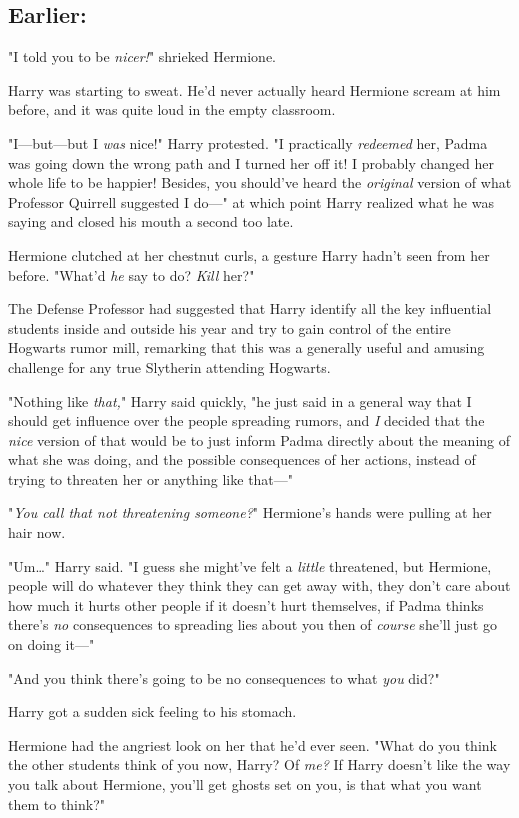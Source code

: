 \subsection{Earlier:}

"I told you to be \emph{nicer!}" shrieked Hermione.

Harry was starting to sweat. He'd never actually heard Hermione scream at him
before, and it was quite loud in the empty classroom.

"I---but---but I \emph{was} nice!" Harry protested. "I practically
\emph{redeemed} her, Padma was going down the wrong path and I turned her off
it! I probably changed her whole life to be happier! Besides, you should've
heard the \emph{original} version of what Professor Quirrell suggested I do---"
at which point Harry realized what he was saying and closed his mouth a second
too late.

Hermione clutched at her chestnut curls, a gesture Harry hadn't seen from her
before. "What'd \emph{he} say to do? \emph{Kill} her?"

The Defense Professor had suggested that Harry identify all the key influential
students inside and outside his year and try to gain control of the entire
Hogwarts rumor mill, remarking that this was a generally useful and amusing
challenge for any true Slytherin attending Hogwarts.

"Nothing like \emph{that,}" Harry said quickly, "he just said in a general way
that I should get influence over the people spreading rumors, and \emph{I}
decided that the \emph{nice} version of that would be to just inform Padma
directly about the meaning of what she was doing, and the possible consequences
of her actions, instead of trying to threaten her or anything like that---"

"\emph{You call that not threatening someone?}" Hermione's hands were pulling
at her hair now.

"Um{\ldots}" Harry said. "I guess she might've felt a \emph{little} threatened,
but Hermione, people will do whatever they think they can get away with, they
don't care about how much it hurts other people if it doesn't hurt themselves,
if Padma thinks there's \emph{no} consequences to spreading lies about you then
of \emph{course} she'll just go on doing it---"

"And you think there's going to be no consequences to what \emph{you} did?"

Harry got a sudden sick feeling to his stomach.

Hermione had the angriest look on her that he'd ever seen. "What do you think
the other students think of you now, Harry? Of \emph{me?} If Harry doesn't like
the way you talk about Hermione, you'll get ghosts set on you, is that what you
want them to think?"

